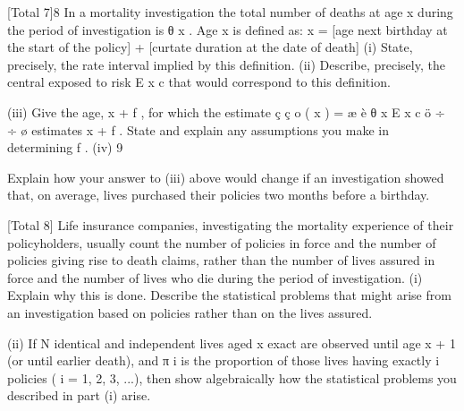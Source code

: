 [Total 7]8
In a mortality investigation the total number of deaths at age x during the period
of investigation is θ x . Age x is defined as:
x = [age next birthday at the start of the policy]
+ [curtate duration at the date of death]
(i) State, precisely, the rate interval implied by this definition.
(ii) Describe, precisely, the central exposed to risk E x c that would correspond
to this definition.

(iii) Give the age, x + f , for which the estimate ç ç \mu o ( x ) =
æ
è
θ x
E x c
ö
÷
÷
ø
estimates \mu x + f .
State and explain any assumptions you make in determining f .
(iv)
9


Explain how your answer to (iii) above would change if an investigation
showed that, on average, lives purchased their policies two months before
a birthday.

[Total 8]
Life insurance companies, investigating the mortality experience of their
policyholders, usually count the number of policies in force and the number of
policies giving rise to death claims, rather than the number of lives assured in
force and the number of lives who die during the period of investigation.
(i) Explain why this is done. Describe the statistical problems that might
arise from an investigation based on policies rather than on the lives
assured.

(ii) If N identical and independent lives aged x exact are observed until age
x + 1 (or until earlier death), and π i is the proportion of those lives having
exactly i policies ( i = 1, 2, 3, ...), then show algebraically how the
statistical problems you described in part (i) arise.

